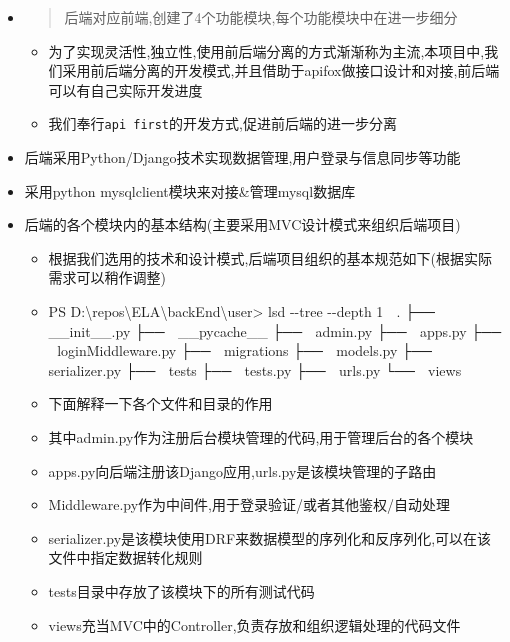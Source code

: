 \documentclass[
]{article}
\newenvironment{Shaded}{}{}
\newcommand{\DecValTok}[1]{\textcolor[rgb]{0.25,0.63,0.44}{#1}}
\newcommand{\FunctionTok}[1]{\textcolor[rgb]{0.02,0.16,0.49}{#1}}
\newcommand{\NormalTok}[1]{#1}
\newcommand{\OperatorTok}[1]{\textcolor[rgb]{0.40,0.40,0.40}{#1}}
\begin{document}
\begin{itemize}
\item
  \begin{quote}
  后端对应前端,创建了4个功能模块,每个功能模块中在进一步细分
  \end{quote}

  \begin{itemize}
  \item
    为了实现灵活性,独立性,使用前后端分离的方式渐渐称为主流,本项目中,我们采用前后端分离的开发模式,并且借助于apifox做接口设计和对接,前后端可以有自己实际开发进度
  \item
    我们奉行\texttt{api\ first}的开发方式,促进前后端的进一步分离
  \end{itemize}
\item
  后端采用Python/Django技术实现数据管理,用户登录与信息同步等功能
\item
  采用python mysqlclient模块来对接\&管理mysql数据库
\item
  后端的各个模块内的基本结构(主要采用MVC设计模式来组织后端项目)

  \begin{itemize}
  \item
    根据我们选用的技术和设计模式,后端项目组织的基本规范如下(根据实际需求可以稍作调整)
  \item
\begin{Shaded}
\begin{Highlighting}[]
\NormalTok{PS D:}\OperatorTok{\textbackslash{}}\NormalTok{repos}\OperatorTok{\textbackslash{}}\NormalTok{ELA}\OperatorTok{\textbackslash{}}\NormalTok{backEnd}\OperatorTok{\textbackslash{}}\NormalTok{user}\OperatorTok{\textgreater{}}\NormalTok{ lsd }\OperatorTok{{-}{-}}\NormalTok{tree }\OperatorTok{{-}{-}}\NormalTok{depth }\DecValTok{1}
\NormalTok{ .}
\NormalTok{├──  }\FunctionTok{\_\_init\_\_}\NormalTok{.py}
\NormalTok{├──  \_\_pycache\_\_}
\NormalTok{├──  admin.py}
\NormalTok{├──  apps.py}
\NormalTok{├──  loginMiddleware.py}
\NormalTok{├──  migrations}
\NormalTok{├──  models.py}
\NormalTok{├──  serializer.py}
\NormalTok{├──  tests}
\NormalTok{├──  tests.py}
\NormalTok{├──  urls.py}
\NormalTok{└──  views}
\end{Highlighting}
\end{Shaded}
  \item
    下面解释一下各个文件和目录的作用
  \item
    其中admin.py作为注册后台模块管理的代码,用于管理后台的各个模块
  \item
    apps.py向后端注册该Django应用,urls.py是该模块管理的子路由
  \item
    Middleware.py作为中间件,用于登录验证/或者其他鉴权/自动处理
  \item
    serializer.py是该模块使用DRF来数据模型的序列化和反序列化,可以在该文件中指定数据转化规则
  \item
    tests目录中存放了该模块下的所有测试代码
  \item
    views充当MVC中的Controller,负责存放和组织逻辑处理的代码文件
  \end{itemize}
\end{itemize}
\end{document}
